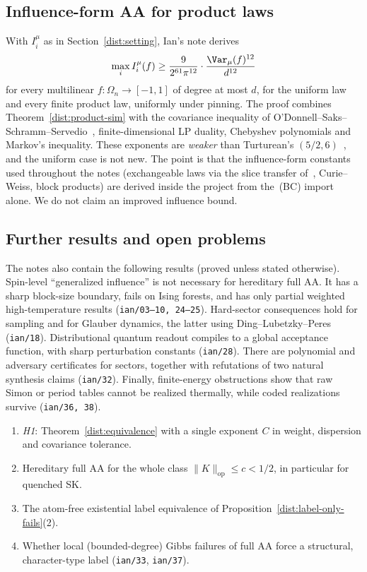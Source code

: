 \subsection{Influence-form AA for product laws}\label{dist:influence}
\begin{remark}
With \(I_i^\mu\) as in Section~\ref{dist:setting}, Ian's note derives
\[
 \max_iI_i^{\mu}(f)\ge\frac{9}{2^{61}\pi^{12}}\cdot\frac{\Var_\mu(f)^{12}}{d^{12}}
\]
for every multilinear \(f:\Omega_n\to[-1,1]\) of degree at most \(d\), for the
uniform law and every finite product law, uniformly under pinning. The proof
combines Theorem~\ref{dist:product-sim} with the covariance inequality of
O'Donnell--Saks--Schramm--Servedio~\cite{OSSS05}, finite-dimensional LP duality,
Chebyshev polynomials and Markov's inequality. These exponents are
\emph{weaker} than Turturean's \((5/2,6)\)~\cite{Tur26}, and the uniform case is
not new. The point is that the influence-form constants used throughout the
notes (exchangeable laws via the slice transfer of~\cite{GMNR26}, Curie--Weiss,
block products) are derived inside the project from the~(BC) import alone. We
do not claim an improved influence bound.
\end{remark}

\subsection{Further results and open problems}\label{dist:open}
The notes also contain the following results (proved unless stated otherwise).
Spin-level ``generalized influence'' is not necessary for hereditary full AA.
It has a sharp block-size boundary, fails on Ising forests, and has only
partial weighted high-temperature results (\texttt{ian/03--10, 24--25}).
Hard-sector consequences hold for sampling and for Glauber dynamics, the latter
using Ding--Lubetzky--Peres (\texttt{ian/18}). Distributional quantum readout
compiles to a global acceptance function, with sharp perturbation constants
(\texttt{ian/28}). There are polynomial and adversary certificates for sectors,
together with refutations of two natural synthesis claims (\texttt{ian/32}).
Finally, finite-energy obstructions show that raw Simon or period tables cannot
be realized thermally, while coded realizations survive (\texttt{ian/36, 38}).

\begin{problem}\label{dist:open-list}
\leavevmode
\begin{enumerate}
\item \emph{H1}: Theorem~\ref{dist:equivalence} with a single exponent \(C\) in
weight, dispersion and covariance tolerance.
\item Hereditary full AA for the whole class \(\|K\|_{\mathrm{op}}\le c<1/2\),
in particular for quenched SK.
\item The atom-free existential label equivalence of
Proposition~\ref{dist:label-only-fails}(2).
\item Whether local (bounded-degree) Gibbs failures of full AA force a
structural, character-type label (\texttt{ian/33}, \texttt{ian/37}).
\end{enumerate}
\end{problem}
